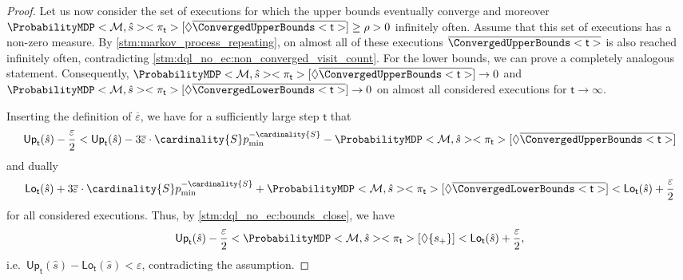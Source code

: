 \documentclass{article}
\newcommand{\setcomplement}[1]{\overline{#1}}
\newcommand{\MDP}{\mathcal{M}}
\newcommand{\States}{S}
\newcommand{\initialstate}{\hat{s}}
\newcommand{\strategy}{\pi}
\newcommand{\reach}{\Diamond}
\newcommand{\upperbound}{\mathsf{Up}}
\newcommand{\lowerbound}{\mathsf{Lo}}
\newcommand{\targetstate}{s_+}
\newcommand{\updatestep}{{\overline{\varepsilon}}}
\newcommand{\algostep}{\mathsf{t}}
\begin{document}
\begin{proof}
	Let us now consider the set of executions for which the upper bounds eventually converge and moreover $\ProbabilityMDP<\MDP, \initialstate><\strategy_\algostep>[\reach \setcomplement{\ConvergedUpperBounds<\algostep>}] \geq \rho > 0$ infinitely often.
	Assume that this set of executions has a non-zero measure.
	By \cref{stm:markov_process_repeating}, on almost all of these executions $\setcomplement{\ConvergedUpperBounds<\algostep>}$ is also reached infinitely often, contradicting \cref{stm:dql_no_ec:non_converged_visit_count}.
	For the lower bounds, we can prove a completely analogous statement.
	Consequently, $\ProbabilityMDP<\MDP, \initialstate><\strategy_{\algostep}>[\reach \setcomplement{\ConvergedUpperBounds<\algostep>}] \to 0$ and $\ProbabilityMDP<\MDP, \initialstate><\strategy_{\algostep}>[\reach \setcomplement{\ConvergedLowerBounds<\algostep>}] \to 0$ on almost all considered executions for $\algostep \to \infty$.

	Inserting the definition of $\updatestep$, we have for a sufficiently large step $\algostep$ that
	\begin{equation*}
		\upperbound_\algostep(\initialstate) - \frac{\varepsilon}{2} < \upperbound_\algostep(\initialstate) - 3 \updatestep \cdot \cardinality{\States} p_{\min}^{-\cardinality{\States}} - \ProbabilityMDP<\MDP, \initialstate><\strategy_\algostep>[\reach \overline{\ConvergedUpperBounds<\algostep>}]
	\end{equation*}
	and dually
	\begin{equation*}
		\lowerbound_\algostep(\initialstate) + 3 \updatestep \cdot \cardinality{\States} p_{\min}^{-\cardinality{\States}} + \ProbabilityMDP<\MDP, \initialstate><\strategy_\algostep>[\reach \overline{\ConvergedLowerBounds<\algostep>}] < \lowerbound_\algostep(\initialstate) + \frac{\varepsilon}{2}
	\end{equation*}
	for all considered executions.
	Thus, by \cref{stm:dql_no_ec:bounds_close}, we have
	\begin{equation*}
		\upperbound_\algostep(\initialstate) - \frac{\varepsilon}{2} < \ProbabilityMDP<\MDP, \initialstate><\strategy_\algostep>[\reach \{\targetstate\}] < \lowerbound_\algostep(\initialstate) + \frac{\varepsilon}{2},
	\end{equation*}
	i.e.\ $\upperbound_\algostep(\initialstate) - \lowerbound_\algostep(\initialstate) < \varepsilon$, contradicting the assumption.


\end{proof}
\end{document}
